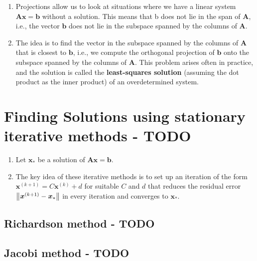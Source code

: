 \begin{enumerate}
    \item Projections allow us to look at situations where we have a linear system $\bm{Ax} = \bm{b}$ without a solution.
    This means that b does not lie in the span of $\bm{A}$, i.e., the vector $\bm{b}$ does not lie in the subspace spanned by the columns of $\bm{A}$. 
    \hfill \cite{mfml/book/mml/Deisenroth-Faisal-Ong}

    \item The idea is to find the vector in the subspace spanned by the columns of $\bm{A}$ that is closest to $\bm{b}$, i.e., we compute the orthogonal projection of $\bm{b}$ onto the subspace spanned by the columns of $\bm{A}$.
    This problem arises often in practice, and the solution is called the \textbf{least-squares solution} (assuming the dot product as the inner product) of an overdetermined system. 
    \hfill \cite{mfml/book/mml/Deisenroth-Faisal-Ong}
\end{enumerate}











\section{Finding Solutions using stationary iterative methods - TODO}

\begin{enumerate}
    \item Let $\bm{x}_\ast$ be a solution of $\bm{Ax} = \bm{b}$.
    \hfill \cite{mfml/book/mml/Deisenroth-Faisal-Ong}
    
    \item The key idea of these iterative methods is to set up an iteration of the form
    $
        \bm{x}^{(k+1)} = C\bm{x}^{(k)} + d
    $
    for suitable $C$ and $d$ that reduces the residual error $\left\| \bm{x}^{(k+1)} - \bm{x}_\ast \right\|$ in every iteration and converges to $\bm{x}_\ast$.
    \hfill \cite{mfml/book/mml/Deisenroth-Faisal-Ong}

\end{enumerate}


\subsection{Richardson method - TODO}


\subsection{Jacobi method - TODO}


